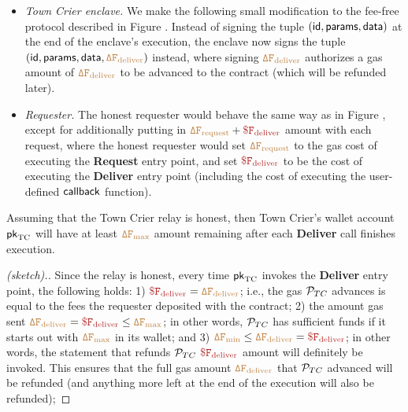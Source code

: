 \begin{itemize}[leftmargin=5mm]
\item
{\it Town Crier enclave.}
We make the following small modification to the fee-free protocol
described in Figure .
Instead of signing the tuple $({\sf id}, {\sf params}, {\sf data})$
at the end of the enclave's execution, the enclave now signs 
the tuple $({\sf id}, {\sf params}, {\sf data}, 
\tt {\color{brown} \Delta F_{\text{deliver}} })$
instead, where signing 
$\tt {\color{brown} \Delta F_{\text{deliver}} }$ authorizes a
gas amount of $\tt {\color{brown} \Delta F_{\text{deliver}} }$ to be advanced
to the contract (which will be refunded later).
\item
{\it Requester.}
The honest requester would behave the same way as in Figure ,
except for additionally putting 
in $\sbrown{\Delta F_{\text{request}}} + \smaroon{\$ F_{\text{deliver}}}$ 
amount with each request, 
where the honest 
requester would set  
$\tt {\color{brown} \Delta F_{\text{request}} }$
to the gas cost of executing the  
{\bf Request} entry point,
and set $\smaroon{\$ F_{\text{deliver}}}$ to be the cost 
of executing the {\bf Deliver} entry point (including
the cost of executing the user-defined ${\sf callback}$ function).
\end{itemize}

\begin{theorem}
Assuming that the Town Crier relay is honest, 
then Town Crier's wallet account ${\sf pk}_{\textrm{TC}}$ 
will have at least $\tt {\color{brown} \Delta F_{\text{max}} }$
amount remaining after each {\bf Deliver}  
call finishes execution.
\end{theorem}
\begin{proof}[(sketch).]
Since the relay is honest, every time 
${\sf pk}_{\textrm{TC}}$ invokes the {\bf Deliver}
entry point, the following holds:
1) 
$\smaroon{\$ F_{\text{deliver}}}
= \sbrown{\Delta F_{\text{deliver}}}$;
i.e., the gas ${\cal P}_{TC}$ advances is equal
to the fees the 
requester deposited with the \tcont contract;
2)
the amount gas sent 
$\sbrown{\Delta F_{\text{deliver}}} = 
\smaroon{\$ F_{\text{deliver}}}
\leq 
\sbrown{\Delta F_{\text{max}}} 
$;
in other words, 
${\cal P}_{TC}$ has sufficient funds  
if it starts out with $\tt {\color{brown} \Delta F_{\text{max}} }$
in its wallet;
and
3) 
$\sbrown{\Delta F_{\text{min}}} \leq
\sbrown{\Delta F_{\text{deliver}}} = 
\smaroon{\$ F_{\text{deliver}}}
$; in other words, the statement that refunds
${\cal P}_{TC}$ 
$\smaroon{\$ F_{\text{deliver}}}$
amount will definitely be invoked. This 
ensures that the full gas amount 
$\tt {\color{brown} \Delta F_{\text{deliver}} }$
that ${\cal P}_{TC}$ advanced will be refunded (and anything more left
at the end of the execution will also be refunded);
\end{proof}





\begin{theorem}
\end{theorem}



